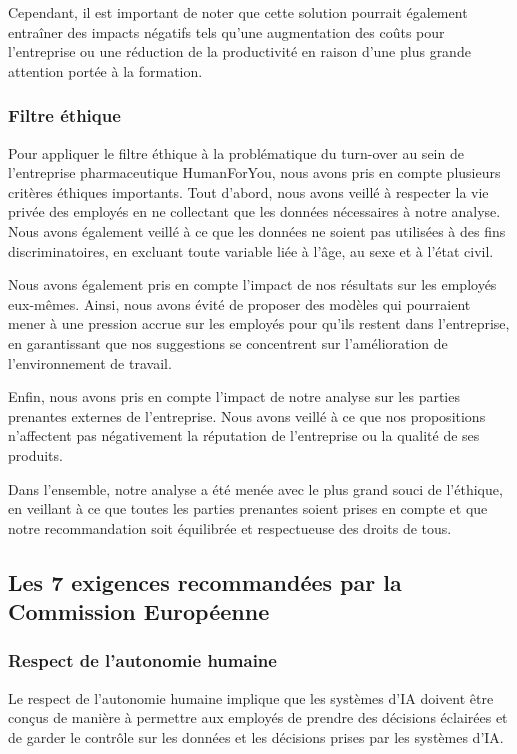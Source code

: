 Cependant, il est important de noter que cette solution pourrait également entraîner des impacts négatifs tels qu'une augmentation des coûts pour l'entreprise ou une réduction de la productivité en raison d'une plus grande attention portée à la formation.  
\subsubsection{Filtre éthique}
Pour appliquer le filtre éthique à la problématique du turn-over au sein de l'entreprise pharmaceutique HumanForYou, nous avons pris en compte plusieurs critères éthiques importants. Tout d'abord, nous avons veillé à respecter la vie privée des employés en ne collectant que les données nécessaires à notre analyse. Nous avons également veillé à ce que les données ne soient pas utilisées à des fins discriminatoires, en excluant toute variable liée à l'âge, au sexe et à l'état civil.

Nous avons également pris en compte l'impact de nos résultats sur les employés eux-mêmes. Ainsi, nous avons évité de proposer des modèles qui pourraient mener à une pression accrue sur les employés pour qu'ils restent dans l'entreprise, en garantissant que nos suggestions se concentrent sur l'amélioration de l'environnement de travail. 

Enfin, nous avons pris en compte l'impact de notre analyse sur les parties prenantes externes de l'entreprise. Nous avons veillé à ce que nos propositions n'affectent pas négativement la réputation de l'entreprise ou la qualité de ses produits. 

Dans l'ensemble, notre analyse a été menée avec le plus grand souci de l'éthique, en veillant à ce que toutes les parties prenantes soient prises en compte et que notre recommandation soit équilibrée et respectueuse des droits de tous.

\newpage
\subsection{Les 7 exigences recommandées par la Commission Européenne }
\subsubsection{Respect de l'autonomie humaine}
Le respect de l'autonomie humaine implique que les systèmes d'IA doivent être conçus de manière à permettre aux employés de prendre des décisions éclairées et de garder le contrôle sur les données et les décisions prises par les systèmes d'IA. 

